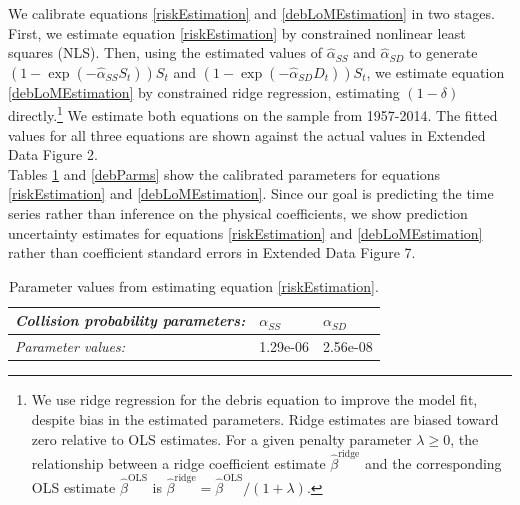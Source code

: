 \documentclass[9pt,twoside,lineno]{pnas-new}
\begin{document}
We calibrate equations \ref{riskEstimation} and \ref{debLoMEstimation} in two stages. First, we estimate equation \ref{riskEstimation} by constrained nonlinear least squares (NLS). Then, using the estimated values of $\hat{\alpha}_{SS}$ and $\hat{\alpha}_{SD}$ to generate $(1-\exp(-\hat{\alpha}_{SS}S_t))S_t$ and $(1-\exp(-\hat{\alpha}_{SD}D_t))S_t$, we estimate equation \ref{debLoMEstimation} by constrained ridge regression, estimating $(1-\delta)$ directly.\footnote{We use ridge regression for the debris equation to improve the model fit, despite bias in the estimated parameters. Ridge estimates are biased toward zero relative to OLS estimates. For a given penalty parameter $\lambda \geq 0$, the relationship between a ridge coefficient estimate $\hat{\beta}^{\text{ridge}}$ and the corresponding OLS estimate $\hat{\beta}^{\text{OLS}}$ is $\hat{\beta}^{\text{ridge}} = \hat{\beta}^{\text{OLS}}/(1+\lambda)$.} We estimate both equations on the sample from 1957-2014. The fitted values for all three equations are shown against the actual values in Extended Data Figure 2. \\

Tables \ref{riskParms} and \ref{debParms} show the calibrated parameters for equations \ref{riskEstimation} and \ref{debLoMEstimation}. Since our goal is predicting the time series rather than inference on the physical coefficients, we show prediction uncertainty estimates for equations \ref{riskEstimation} and \ref{debLoMEstimation} rather than coefficient standard errors in Extended Data Figure 7. \\

\begin{table}[H]
	\centering
	\begin{tabular}{|l|l|l|}
		\hline
		\textit{Collision probability parameters:}      & \textbf{$\alpha_{SS}$} & \textbf{$\alpha_{SD}$} \\ \hline
		\textit{Parameter values:} & 1.29e-06               & 2.56e-08               \\ \hline
	\end{tabular}
	\caption[Parameter values from estimating equation \ref{riskEstimation}]{Parameter values from estimating equation \ref{riskEstimation}.}
	\label{riskParms}
\end{table}
\end{document}
